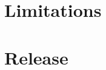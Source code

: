\documentclass[11pt]{article}
\begin{document}
\section{Limitations}

\section{Release}



\end{document}
